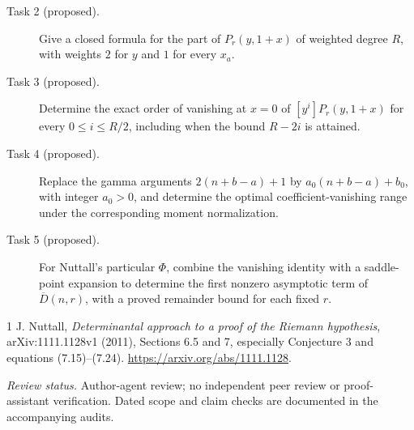 \documentclass[11pt]{article}
\begin{document}
\begin{description}
\item[Task 2 (proposed).] Give a closed formula for the part of $P_r(y,1+x)$
of weighted degree $R$, with weights $2$ for $y$ and $1$ for every $x_a$.
\item[Task 3 (proposed).] Determine the exact order of vanishing at $x=0$
of $[y^i]P_r(y,1+x)$ for every $0\leq i\leq R/2$, including when the
bound $R-2i$ is attained.
\item[Task 4 (proposed).] Replace the gamma arguments $2(n+b-a)+1$ by
$a_0(n+b-a)+b_0$, with integer $a_0>0$, and determine the optimal
coefficient-vanishing range under the corresponding moment normalization.
\item[Task 5 (proposed).] For Nuttall's particular $\Phi$, combine the
vanishing identity with a saddle-point expansion to determine the first
nonzero asymptotic term of $\overline D(n,r)$, with a proved remainder
bound for each fixed $r$.
\end{description}

\begin{thebibliography}{1}
 J. Nuttall, \emph{Determinantal approach to a proof of the
Riemann hypothesis}, arXiv:1111.1128v1 (2011), Sections 6.5 and 7,
especially Conjecture 3 and equations (7.15)--(7.24).
\url{https://arxiv.org/abs/1111.1128}.
\end{thebibliography}
\smallskip
\noindent\textit{Review status.} Author-agent review; no independent peer
review or proof-assistant verification. Dated scope and claim checks
are documented in the accompanying audits.
\end{document}
